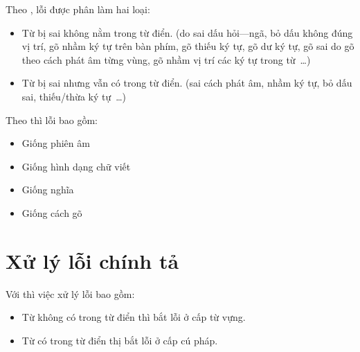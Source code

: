 \documentclass[a4paper,oneside]{book} %
\theoremstyle{break}
\begin{document}
\noindent Theo \cite{Tuoi}, lỗi được phân làm hai loại:
\begin{itemize}
\item Từ bị sai không nằm trong từ điển. (do sai dấu hỏi---ngã, bỏ dấu
  không đúng vị trí, gõ nhầm ký tự trên bàn phím, gõ thiếu ký tự, gõ
  dư ký tự, gõ sai do gõ theo cách phát âm từng vùng, gõ nhầm vị trí
  các ký tự trong từ~\ldots)
\item Từ bị sai nhưng vẫn có trong từ điển. (sai cách phát âm, nhầm ký
  tự, bỏ dấu sai, thiếu/thừa ký tự~\ldots)
\end{itemize}

\noindent Theo \cite{Chang} thì lỗi bao gồm:
\begin{itemize}
\item Giống phiên âm
\item Giống hình dạng chữ viết
\item Giống nghĩa
\item Giống cách gõ
\end{itemize}

\section{Xử lý lỗi chính tả}

Với \cite{Tuoi} thì việc xử lý lỗi bao gồm:
\begin{itemize}
\item Từ không có trong từ điển thì bắt lỗi ở cấp từ vựng.
\item Từ có trong từ điển thị bắt lỗi ở cấp cú pháp.
\end{itemize}


\end{document}
